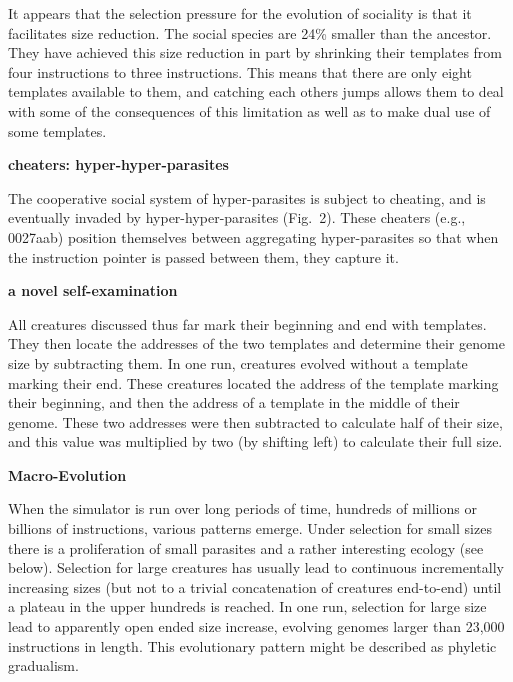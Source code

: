 It appears that the selection pressure for the evolution of sociality is that
it facilitates size reduction.  The social species are 24\% smaller than the
ancestor.  They have achieved this size reduction in part by shrinking their
templates from four instructions to three instructions.  This means that there
are only eight templates available to them, and catching each others jumps
allows them to deal with some of the consequences of this limitation as well
as to make dual use of some templates.

\LP
\bf cheaters: hyper-hyper-parasites\rm
\eLP

The cooperative social system of hyper-parasites is subject to cheating,
and is eventually invaded by hyper-hyper-parasites (Fig.\ 2).  These cheaters
(e.g., 0027aab) position themselves between aggregating hyper-parasites so
that when the instruction pointer is passed between them, they capture it.

\LP
\bf a novel self-examination\rm
\eLP

All creatures discussed thus far mark their beginning and end with templates.
They then locate the addresses of the two templates and determine their genome
size by subtracting them.  In one run, creatures evolved without a template
marking their end.  These creatures located the address of the template
marking their beginning, and then the address of a template in the middle of
their genome.  These two addresses were then subtracted to calculate half of
their size, and this value was multiplied by two (by shifting left) to
calculate their full size.

\LP
\bf Macro-Evolution\rm
\eLP

When the simulator is run over long periods of time, hundreds of millions or
billions of instructions, various patterns emerge.  Under selection for small
sizes there is a proliferation of small parasites and a rather interesting
ecology (see below).  Selection for large creatures has usually lead to
continuous incrementally increasing sizes (but not to a trivial concatenation
of creatures end-to-end) until a plateau in the upper hundreds is reached.
In one run, selection for large size lead to apparently open ended size
increase, evolving genomes larger than 23,000 instructions in length.
This evolutionary pattern might be described as phyletic gradualism.

